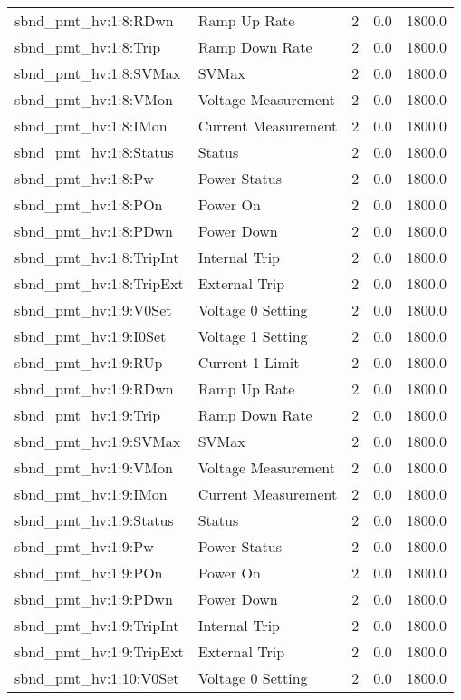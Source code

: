\begin{center}
\begin{longtable}{l | l l l l }
sbnd\_pmt\_hv:1:8:RDwn & Ramp Up Rate & 2 & 0.0 & 1800.0\\ 
sbnd\_pmt\_hv:1:8:Trip & Ramp Down Rate & 2 & 0.0 & 1800.0\\ 
sbnd\_pmt\_hv:1:8:SVMax & SVMax & 2 & 0.0 & 1800.0\\ 
sbnd\_pmt\_hv:1:8:VMon & Voltage Measurement & 2 & 0.0 & 1800.0\\ 
sbnd\_pmt\_hv:1:8:IMon & Current Measurement & 2 & 0.0 & 1800.0\\ 
sbnd\_pmt\_hv:1:8:Status & Status & 2 & 0.0 & 1800.0\\ 
sbnd\_pmt\_hv:1:8:Pw & Power Status & 2 & 0.0 & 1800.0\\ 
sbnd\_pmt\_hv:1:8:POn & Power On & 2 & 0.0 & 1800.0\\ 
sbnd\_pmt\_hv:1:8:PDwn & Power Down & 2 & 0.0 & 1800.0\\ 
sbnd\_pmt\_hv:1:8:TripInt & Internal Trip & 2 & 0.0 & 1800.0\\ 
sbnd\_pmt\_hv:1:8:TripExt & External Trip & 2 & 0.0 & 1800.0\\ 
sbnd\_pmt\_hv:1:9:V0Set & Voltage 0 Setting & 2 & 0.0 & 1800.0\\ 
sbnd\_pmt\_hv:1:9:I0Set & Voltage 1 Setting & 2 & 0.0 & 1800.0\\ 
sbnd\_pmt\_hv:1:9:RUp & Current 1 Limit & 2 & 0.0 & 1800.0\\ 
sbnd\_pmt\_hv:1:9:RDwn & Ramp Up Rate & 2 & 0.0 & 1800.0\\ 
sbnd\_pmt\_hv:1:9:Trip & Ramp Down Rate & 2 & 0.0 & 1800.0\\ 
sbnd\_pmt\_hv:1:9:SVMax & SVMax & 2 & 0.0 & 1800.0\\ 
sbnd\_pmt\_hv:1:9:VMon & Voltage Measurement & 2 & 0.0 & 1800.0\\ 
sbnd\_pmt\_hv:1:9:IMon & Current Measurement & 2 & 0.0 & 1800.0\\ 
sbnd\_pmt\_hv:1:9:Status & Status & 2 & 0.0 & 1800.0\\ 
sbnd\_pmt\_hv:1:9:Pw & Power Status & 2 & 0.0 & 1800.0\\ 
sbnd\_pmt\_hv:1:9:POn & Power On & 2 & 0.0 & 1800.0\\ 
sbnd\_pmt\_hv:1:9:PDwn & Power Down & 2 & 0.0 & 1800.0\\ 
sbnd\_pmt\_hv:1:9:TripInt & Internal Trip & 2 & 0.0 & 1800.0\\ 
sbnd\_pmt\_hv:1:9:TripExt & External Trip & 2 & 0.0 & 1800.0\\ 
sbnd\_pmt\_hv:1:10:V0Set & Voltage 0 Setting & 2 & 0.0 & 1800.0\\ 

\end{longtable}
\end{center}

